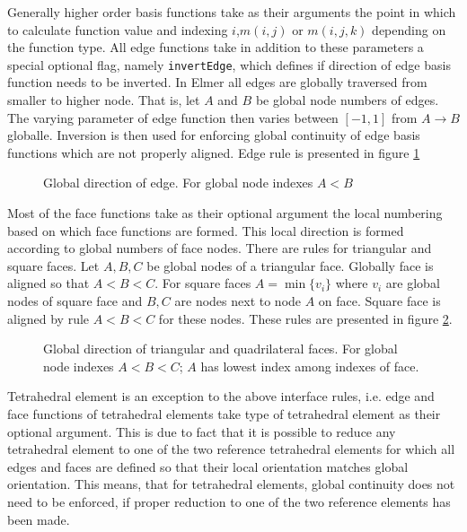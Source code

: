 Generally higher order basis functions take as their arguments the point in which to calculate function value and indexing $i$,$m(i,j)$ or $m(i,j,k)$ depending on the function type. All edge functions take in addition to these parameters a special optional flag, namely \texttt{invertEdge}, which defines if direction of edge basis function needs to be inverted. In Elmer all edges are globally traversed from smaller to higher node. That is, let $A$ and $B$ be global node numbers of edges. The varying parameter of edge function then varies between $[-1,1]$ from $A \rightarrow B$ globalle. Inversion is then used for enforcing global continuity of edge basis functions which are not properly aligned.  Edge rule is presented in figure \ref{fig:parityedge}

\begin{figure}[tbhp]
\begin{center}
\label{fig:parityedge}

\end{center}
\caption{Global direction of edge. For global node indexes $A<B$}
\end{figure}

Most of the face functions take as their optional argument the local numbering based on which face functions are formed. This local direction is formed according to global numbers of face nodes. There are rules for triangular and square faces. Let $A,B,C$ be global nodes of a triangular face. Globally face is aligned so that $A<B<C$. For square faces $A=\min\{v_i\}$ where $v_i$ are global nodes of square face and $B,C$ are nodes next to node $A$ on face. Square face is aligned by rule $A<B<C$ for these nodes. These rules are presented in figure \ref{fig:parityqt}.

\begin{figure}[tbhp]
\begin{center}
\label{fig:parityqt}

\end{center}
\caption{Global direction of triangular and quadrilateral faces. For global node indexes $A<B<C$; $A$ has lowest index among indexes of face.}
\end{figure}

Tetrahedral element is an exception to the above interface rules, i.e. edge and face functions of tetrahedral elements take type of tetrahedral element as their optional argument. This is due to fact that it is possible to reduce any tetrahedral element to one of the two reference tetrahedral elements for which all edges and faces are defined so that their local orientation matches global orientation. This means, that for tetrahedral elements, global continuity does not need to be enforced, if proper reduction to one of the two reference elements has been made. 


